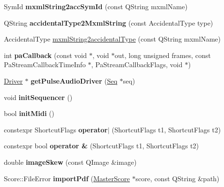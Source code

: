 \begin{DoxyCompactItemize}
Sym\+Id {\bfseries mxml\+String2acc\+Sym\+Id} (const Q\+String mxml\+Name)
\item 
\mbox{\label{namespace_ms_a44acdf4a85cef5a0b5295fa6c7140ad2}} 
Q\+String {\bfseries accidental\+Type2\+Mxml\+String} (const Accidental\+Type type)
\item 
Accidental\+Type \hyperlink{namespace_ms_a94240a62bea40ae63d55720926c0d991}{mxml\+String2accidental\+Type} (const Q\+String mxml\+Name)
\item 
\mbox{\label{namespace_ms_a249cd9870575b86385aa7b6e92d77e7a}} 
int {\bfseries pa\+Callback} (const void $\ast$, void $\ast$out, long unsigned frames, const Pa\+Stream\+Callback\+Time\+Info $\ast$, Pa\+Stream\+Callback\+Flags, void $\ast$)
\item 
\mbox{\label{namespace_ms_a8fd30a01dcb4d5d26429890bc61fba96}} 
\hyperlink{class_ms_1_1_driver}{Driver} $\ast$ {\bfseries get\+Pulse\+Audio\+Driver} (\hyperlink{class_ms_1_1_seq}{Seq} $\ast$seq)
\item 
\mbox{\label{namespace_ms_a1de0131861d70fc5acb801670c85b64b}} 
void {\bfseries init\+Sequencer} ()
\item 
\mbox{\label{namespace_ms_a2e295f1e5aba8a446a0ef7059e6ff03d}} 
bool {\bfseries init\+Midi} ()
\item 
\mbox{\label{namespace_ms_a73aa579a502bf5705e614fda317ebc8d}} 
constexpr Shortcut\+Flags {\bfseries operator$\vert$} (Shortcut\+Flags t1, Shortcut\+Flags t2)
\item 
\mbox{\label{namespace_ms_af37c0f82d8995243d9eee952d197a8a6}} 
constexpr bool {\bfseries operator \&} (Shortcut\+Flags t1, Shortcut\+Flags t2)
\item 
\mbox{\label{namespace_ms_a959108f9e2a58c0d3b5856f37a3f3aba}} 
double {\bfseries image\+Skew} (const Q\+Image \&image)
\item 
\mbox{\label{namespace_ms_ab37d30fd089217c07cf66031a8871bad}} 
Score\+::\+File\+Error {\bfseries import\+Pdf} (\hyperlink{class_ms_1_1_master_score}{Master\+Score} $\ast$score, const Q\+String \&path)

\end{DoxyCompactItemize}
